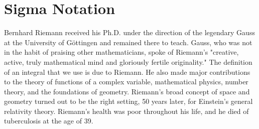 \documentclass[10pt]{report}
\begin{document}
\chapter{Sigma Notation}
Bernhard Riemann received his Ph.D. under the direction of the legendary Gauss at the University of G\"{o}ttingen and remained there to teach. Gauss, who was not in the habit of praising other mathematicians, spoke of Riemann's "creative, active, truly mathematical mind and gloriously fertile originality." The definition of an integral that we use is due to Riemann. He also made major contributions to the theory of functions of a complex variable, mathematical physics, number theory, and the foundations of geometry. Riemann's broad concept of space and geometry turned out to be the right setting, 50 years later, for Einstein's general relativity theory. Riemann's health was poor throughout his life, and he died of tuberculosis at the age of 39.
\end{document}

